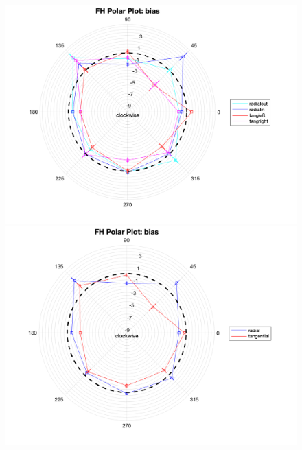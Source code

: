 \documentclass[11pt]{article} %
\begin{document}
\begin{figure}[H]
\centering %
\includegraphics[scale=.3]{Images/FH_PP_bias_Alldata_4conds.png}
\includegraphics[scale=.3]{Images/FH_PP_bias_Alldata_2conds.png}
\end{figure}
\end{document}
